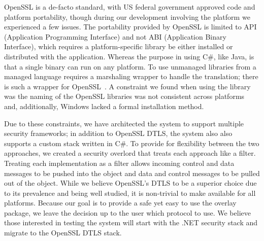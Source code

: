 \documentclass[conference]{IEEEtran}
\begin{document}
OpenSSL is a de-facto standard, with US federal government approved code and 
platform portability, though during our development involving the platform we
experienced a few
issues.  The portability provided by OpenSSL is limited to API (Application
Programming Interface) and not ABI (Application Binary Interface), which
requires a platform-specific library be either installed or distributed with
the application.  Whereas the purpose in using C\#, like Java, is that a single
binary can run on any platform.  To use unmanaged libraries from a managed
language requires a marshaling wrapper to handle the translation; there is
such a wrapper for OpenSSL~\cite{openssl.net}.  A constraint we found when
using the library was the naming of the OpenSSL libraries was not consistent
across platforms and, additionally, Windows lacked a formal installation method.

Due to these constraints, we have architected the system to
support multiple security frameworks; in addition to OpenSSL DTLS, the system
also also supports a custom stack written in C\#.  To provide for
flexibility between the two approaches, we created a security overlord that
treats each approach like a filter.  Treating each implementation as a filter
allows incoming control and data messages to be pushed into the object and data
and control messages to be pulled out of the object.  While we believe OpenSSL's
DTLS to be a superior choice due to its prevalence and being well studied, it is
non-trivial to make available for all platforms.  Because our goal is to provide
a safe yet easy to use the overlay package, we leave the decision up to the user
which protocol to use.  We believe those interested in testing the system will
start with the .NET security stack and migrate to the OpenSSL DTLS stack.



\end{document}
